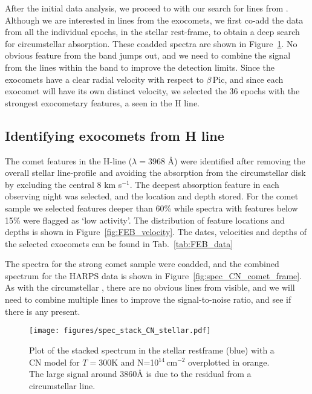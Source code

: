 \documentclass{aa}
\newcommand{\kms}{km s$^{-1}$}
\newcommand{\bp}{$\beta$\,Pic}
\begin{document}
After the initial data analysis, we proceed to with our search for lines from .
%
Although we are interested in lines from the exocomets, we first co-add the data from all the individual epochs, in the stellar rest-frame, to obtain a deep search for circumstellar  absorption.
%
These coadded spectra are shown in Figure~\ref{fig:spec_CN_stellar_frame}.
%
No obvious feature from the  band jumps out, and we need to combine the signal from the lines within the  band to improve the detection limits.
%
Since the exocomets have a clear radial velocity with respect to \bp{}, and since each exocomet will have its own distinct velocity, we selected the 36 epochs with the strongest exocometary features, a seen in the  H line. 

\subsection{Identifying exocomets from \texorpdfstring{}{CaII} H line}\label{sect:FEBid}

The comet features in the  H-line ($\lambda=3968$ \AA) were identified after removing the overall stellar line-profile and avoiding the absorption from the circumstellar disk by excluding the central 8 \kms{}.
%
The deepest absorption feature in each observing night was selected, and the location and depth stored.
%
For the comet sample we selected features deeper than 60\% while spectra with features below 15\% were flagged as `low activity'.
%
The distribution of feature locations and depths is shown in Figure~\ref{fig:FEB_velocity}. The dates, velocities and depths of the selected exocomets can be found in Tab.~\ref{tab:FEB_data}

The spectra for the strong comet sample were coadded, and the combined spectrum for the HARPS data is shown in Figure~\ref{fig:spec_CN_comet_frame}.
%
As with the circumstellar , there are no obvious lines from  visible, and we will need to combine multiple lines to improve the signal-to-noise ratio, and see if there is any  present. 

\begin{figure}
    \begin{centering}
        \texttt{[image: figures/spec\_stack\_CN\_stellar.pdf]}
        \caption{Plot of the stacked spectrum in the stellar restframe (blue) with a CN model for $T=$300K and N=10$^{14}$\,cm$^{-2}$ overplotted in orange.
        The large signal around 3860\AA{} is due to the residual from a circumstellar  line.}
        \label{fig:spec_CN_stellar_frame}
    \end{centering}
\end{figure}
\end{document}
